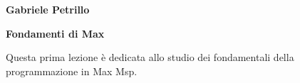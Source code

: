 \documentclass[11pt]{article}
\begin{document}
\begin{minipage}{0.55\linewidth}
\vspace{0.3cm}
{\large{\textbf{\textsf{Gabriele Petrillo}}}}\\\end{minipage}

\vspace{0.3cm}
\begin{minipage}{0.95\linewidth}
\begin{center}
{\huge{\textbf{\textsf{Fondamenti di Max}}}} \\
\end{center}
\end{minipage}
\vspace*{0.2cm}


\begin{center}
\begin{minipage}[c]{14cm}
\begin{textit}

Questa prima lezione è dedicata allo studio dei fondamentali della programmazione in Max Msp.

\end{textit}
\end{minipage}
\end{center}
\vspace*{0.2cm}

\end{document}
